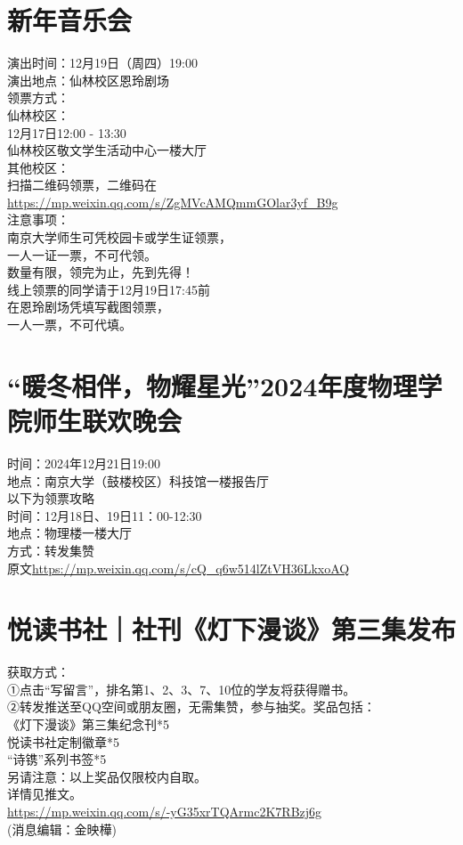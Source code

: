 \documentclass[letterpaper, 12pt]{article}
\begin{document}
\begin{multicols}{2}
\section{新年音乐会}
演出时间：12月19日（周四）19:00\\
演出地点：仙林校区恩玲剧场\\
领票方式：\\
仙林校区：\\
12月17日12:00 - 13:30\\
仙林校区敬文学生活动中心一楼大厅\\
其他校区：\\
扫描二维码领票，二维码在\url{https://mp.weixin.qq.com/s/ZgMVcAMQmmGOlar3yf_B9g}\\
注意事项：\\
南京大学师生可凭校园卡或学生证领票，\\
一人一证一票，不可代领。\\
数量有限，领完为止，先到先得！\\
线上领票的同学请于12月19日17:45前\\
在恩玲剧场凭填写截图领票，\\
一人一票，不可代填。\\

\section{“暖冬相伴，物耀星光”2024年度物理学院师生联欢晚会}
时间：2024年12月21日19:00\\
地点：南京大学（鼓楼校区）科技馆一楼报告厅\\
以下为领票攻略\\
时间：12月18日、19日11：00-12:30\\
地点：物理楼一楼大厅\\
方式：转发集赞\\
原文\url{https://mp.weixin.qq.com/s/cQ_q6w514lZtVH36LkxoAQ}

\section{悦读书社｜社刊《灯下漫谈》第三集发布}
获取方式：\\
①点击“写留言”，排名第1、2、3、7、10位的学友将获得赠书。\\
②转发推送至QQ空间或朋友圈，无需集赞，参与抽奖。奖品包括：\\
《灯下漫谈》第三集纪念刊*5\\
悦读书社定制徽章*5\\
“诗镌”系列书签*5\\
另请注意：以上奖品仅限校内自取。\\
详情见推文。\\
\url{https://mp.weixin.qq.com/s/-yG35xrTQArmc2K7RBzj6g}\\
(消息编辑：金映樺)


\end{multicols}
\end{document}
